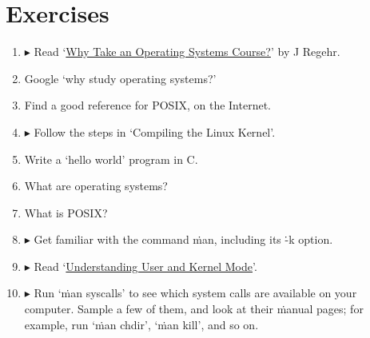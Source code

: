 \section{Exercises}

\begin{enumerate}
\item
  $\blacktriangleright$
  Read  `\href{http://blog.regehr.org/archives/164}{Why Take an Operating Systems Course?}'
    by J Regehr.
\item Google `why study operating systems?'
\item Find a good reference for POSIX, on the Internet.
\item
  $\blacktriangleright$
  Follow the steps in `Compiling the Linux Kernel'.
\item Write a `hello world' program in C.
\item What are operating systems?
\item What is POSIX?
\item
  $\blacktriangleright$
  Get familiar with the command \.{man}, including its \.{-k} option.
\item
  $\blacktriangleright$
  Read `\href{http://blog.codinghorror.com/understanding-user-and-kernel-mode/}{Understanding User and Kernel Mode}'.
\item
  $\blacktriangleright$
  Run `\.{man syscalls}' to see which system calls are available on your computer.
  Sample a few of them, and look at their \.{man}ual pages;
  for example, run
    `\.{man chdir}',
    `\.{man kill}',
    and so on.
\end{enumerate}


